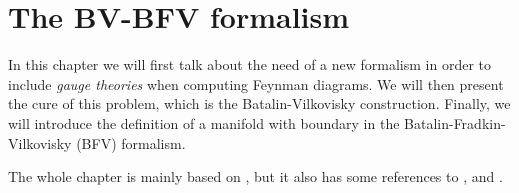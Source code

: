 \chapter{The BV-BFV formalism}
\label{chap:BV-BFV}

In this chapter we will first talk about the need of a new formalism in order to include \emph{gauge theories} when computing Feynman diagrams.
We will then present the cure of this problem, which is the Batalin-Vilkovisky construction.
Finally, we will introduce the definition of a manifold with boundary in the Batalin-Fradkin-Vilkovisky (BFV) formalism.

The whole chapter is mainly based on \cite{Nima}, but it also has some references to \cite{Musio},\cite{Mnfd_boundaries} and \cite{Lectures}.



